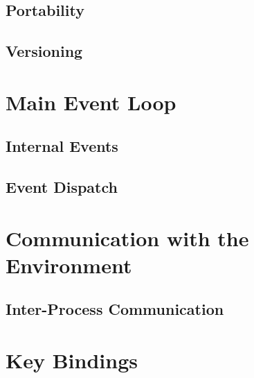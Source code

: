 \documentclass[conference]{IEEEtran}
\begin{document}
\subsection{Portability}
{ \textcolor{gray}\blindtext }

\subsection{Versioning}
{ \textcolor{gray}\blindtext }

\section{Main Event Loop}
{ \textcolor{gray}\blindtext }

\subsection{Internal Events}
{ \textcolor{gray}\blindtext }

\subsection{Event Dispatch}
{ \textcolor{gray}\blindtext }

\section{Communication with the Environment}
{ \textcolor{gray}\blindtext }

\subsection{Inter-Process Communication}
{ \textcolor{gray}\blindtext }

\section{Key Bindings}
{ \textcolor{gray}\blindtext }
\end{document}
